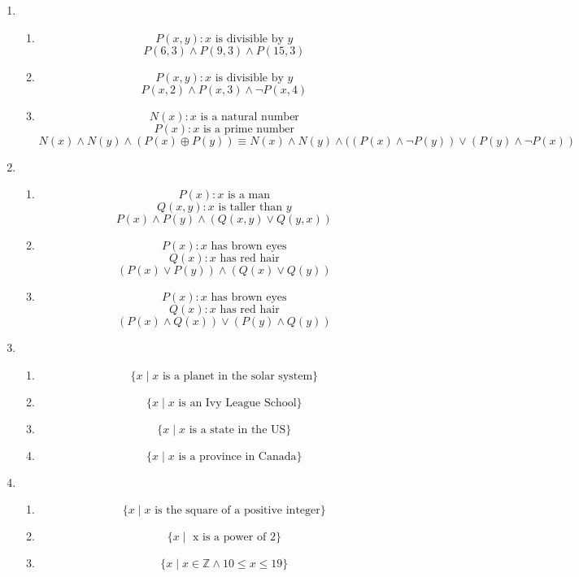 \begin{enumerate}
    \item
    \begin{enumerate}
        \item 
            \[P(x,y): x \text{ is divisible by } y\]
            \[P(6,3) \land P(9,3) \land P(15,3)\]
        \item
            \[P(x,y): x \text{ is divisible by } y\]
            \[P(x, 2) \land P(x, 3) \land \lnot P(x, 4)\]
        \item
            \[N(x): x \text{ is a natural number}\]
            \[P(x): x \text{ is a prime number}\]
            \[N(x) \land N(y) \land (P(x) \oplus P(y)) \equiv N(x) \land N(y) \land ((P(x) \land \lnot P(y)) \lor (P(y) \land \lnot P(x))\]
    \end{enumerate}
    \item
    \begin{enumerate}
        \item 
        \[P(x): x \text{ is a man}\]
        \[Q(x,y): x \text{ is taller than } y\]
        \[P(x) \land P(y) \land (Q(x,y) \lor Q(y,x))\]
        \item
        \[P(x): x \text{ has brown eyes}\]
        \[Q(x): x \text{ has red hair}\]
        \[(P(x) \lor P(y)) \land (Q(x) \lor Q(y))\]
        \item
        \[P(x): x \text{ has brown eyes}\]
        \[Q(x): x \text{ has red hair}\]
        \[(P(x) \land Q(x)) \lor (P(y) \land Q(y))\]
    \end{enumerate}
    \item
    \begin{enumerate}
        \item
        \[\{x \mid x \text{ is a planet in the solar system}\}\]
        \item
        \[\{x \mid x \text{ is an Ivy League School}\}\]
        \item 
        \[\{x \mid x \text{ is a state in the US}\}\]
        \item
        \[\{x \mid x \text{ is a province in Canada}\}\]
    \end{enumerate}
    \item 
    \begin{enumerate}
        \item \[\{x \mid x \text{ is the square of a positive integer}\}\]
        \item \[\{x \mid \text{ x is a power of } 2\}\]
        \item \[\{x \mid x \in \mathbb{Z} \land 10 \leq x \leq 19\}\]

\end{enumerate}
\end{enumerate}
